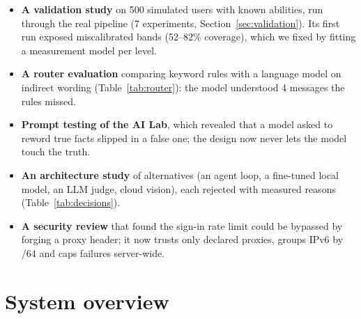 \documentclass[11pt,a4paper]{article}
\begin{document}
\begin{findbox}[title={Our own investigations}]
\begin{itemize}[leftmargin=1.1em]
\item \textbf{A validation study} on 500 simulated users with known abilities, run through the real pipeline (7 experiments, Section~\ref{sec:validation}). Its first run exposed miscalibrated bands (52--82\% coverage), which we fixed by fitting a measurement model per level.
\item \textbf{A router evaluation} comparing keyword rules with a language model on indirect wording (Table~\ref{tab:router}): the model understood 4 messages the rules missed.
\item \textbf{Prompt testing of the AI Lab}, which revealed that a model asked to reword true facts slipped in a false one; the design now never lets the model touch the truth.
\item \textbf{An architecture study} of alternatives (an agent loop, a fine-tuned local model, an LLM judge, cloud vision), each rejected with measured reasons (Table~\ref{tab:decisions}).
\item \textbf{A security review} that found the sign-in rate limit could be bypassed by forging a proxy header; it now trusts only declared proxies, groups IPv6 by /64 and caps failures server-wide.
\end{itemize}
\end{findbox}

\section{System overview}
\end{document}
